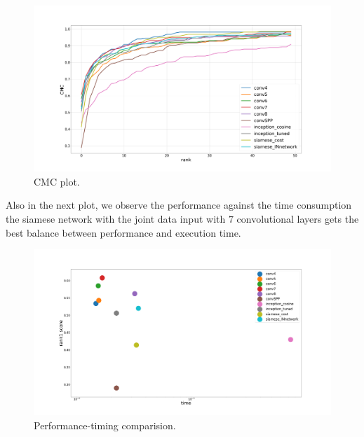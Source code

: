 \documentclass[12pt, a4paper, titlepage,twoside,openright]{article}
\begin{document}
\begin{figure}[hptb]
\centering         
\includegraphics[width=12cm]{siameseDev/cmcNetwors.png}
\caption{CMC plot.} \label{lossesSiam2}
\end{figure}

Also in the next plot, we observe the performance against the time consumption the siamese network with the joint data input with $7$ convolutional layers gets the best balance between performance and execution time. 

\begin{figure}[hptb]
\centering         
\includegraphics[width=12cm]{siameseDev/results.png}
\caption{Performance-timing comparision.} \label{lossesSiam3}
\end{figure}


%		
%
%
\end{document}
